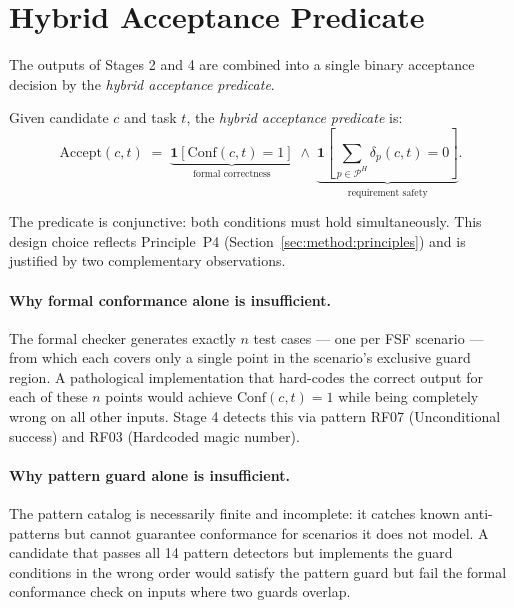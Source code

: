 \section{Hybrid Acceptance Predicate}
\label{sec:method:accept}

The outputs of Stages 2 and 4 are combined into a single binary acceptance
decision by the \emph{hybrid acceptance predicate}.

\begin{definition}
\label{def:accept}
Given candidate $c$ and task $t$, the \emph{hybrid acceptance predicate} is:
\begin{equation}
  \mathrm{Accept}(c, t) \;=\;
    \underbrace{\mathbf{1}\!\left[\mathrm{Conf}(c, t) = 1\right]}_{\text{formal correctness}}
    \;\land\;
    \underbrace{\mathbf{1}\!\left[\sum_{p \in \mathcal{P}^H}
      \delta_p(c, t) = 0\right]}_{\text{requirement safety}}.
  \label{eq:accept}
\end{equation}
\end{definition}

The predicate is conjunctive: both conditions must hold simultaneously.
This design choice reflects Principle~P4 (Section~\ref{sec:method:principles})
and is justified by two complementary observations.

\paragraph{Why formal conformance alone is insufficient.}
The formal checker generates exactly $n$ test cases — one per FSF scenario —
from which each covers only a single point in the scenario's exclusive guard
region.  A pathological implementation that hard-codes the correct output for
each of these $n$ points would achieve $\mathrm{Conf}(c,t) = 1$ while being
completely wrong on all other inputs.  Stage 4 detects this via pattern RF07
(Unconditional success) and RF03 (Hardcoded magic number).

\paragraph{Why pattern guard alone is insufficient.}
The pattern catalog is necessarily finite and incomplete: it catches known
anti-patterns but cannot guarantee conformance for scenarios it does not
model.  A candidate that passes all 14 pattern detectors but implements the
guard conditions in the wrong order would satisfy the pattern guard but fail
the formal conformance check on inputs where two guards overlap.

